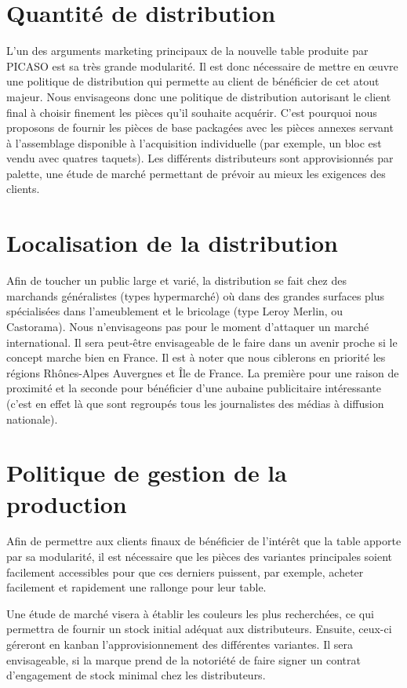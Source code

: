 \section{Quantité de distribution}
L'un des arguments marketing principaux de la nouvelle table 
produite par PICASO est sa très grande modularité. Il est donc
nécessaire de mettre en \oe uvre une politique de distribution qui
permette au client de bénéficier de cet atout majeur. Nous envisageons
donc une politique de distribution autorisant le client final à choisir
finement les pièces qu'il souhaite acquérir. C'est pourquoi nous proposons de
fournir les pièces de base packagées avec les pièces annexes servant à
l'assemblage disponible à l'acquisition individuelle (par exemple, un
bloc est vendu avec quatres taquets). Les différents distributeurs 
sont approvisionnés par palette, une étude de marché permettant de
prévoir au mieux les exigences des clients.

\section{Localisation de la distribution}
Afin de toucher un public large et varié, la distribution se fait chez des
marchands généralistes (types hypermarché) où dans des grandes surfaces
plus spécialisées dans l'ameublement et le bricolage (type Leroy Merlin,
ou Castorama). Nous n'envisageons pas pour le moment d'attaquer un
marché international. Il sera peut-être envisageable de le faire dans un
avenir proche si le concept marche bien en France. Il est à noter que
nous ciblerons en priorité les régions Rhônes-Alpes Auvergnes et Île de
France. La première pour une raison de proximité et la seconde pour
bénéficier d'une aubaine publicitaire intéressante (c'est en effet là
que sont regroupés tous les journalistes des médias à diffusion
nationale).

\section{Politique de gestion de la production}
Afin de permettre aux clients finaux de bénéficier de l'intérêt que la
table apporte par sa modularité, il est nécessaire que les pièces des
variantes principales soient facilement accessibles pour que ces
derniers puissent, par exemple, acheter facilement et rapidement une
rallonge pour leur table.

Une étude de marché visera à établir les couleurs les plus recherchées,
ce qui permettra de fournir un stock initial adéquat aux distributeurs.
Ensuite, ceux-ci géreront en kanban l'approvisionnement des différentes
variantes. Il sera envisageable, si la marque prend de la notoriété de
faire signer un contrat d'engagement de stock minimal chez les
distributeurs.
